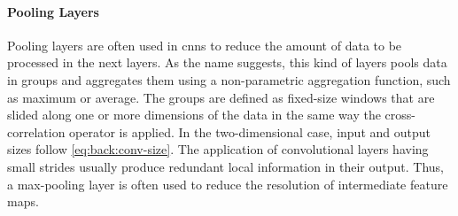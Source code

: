 \paragraph{Pooling Layers}
Pooling layers are often used in \glspl{cnn} to reduce the amount of data to be processed in the next layers.
As the name suggests, this kind of layers pools data in groups and aggregates them using a non-parametric aggregation function, such as maximum or average.
The groups are defined as fixed-size windows that are slided along one or more dimensions of the data in the same way the cross-correlation operator is applied.
In the two-dimensional case, input and output sizes follow \ref{eq:back:conv-size}.
The application of convolutional layers having small strides usually produce redundant local information in their output.
Thus, a max-pooling layer is often used to reduce the resolution of intermediate feature maps.


